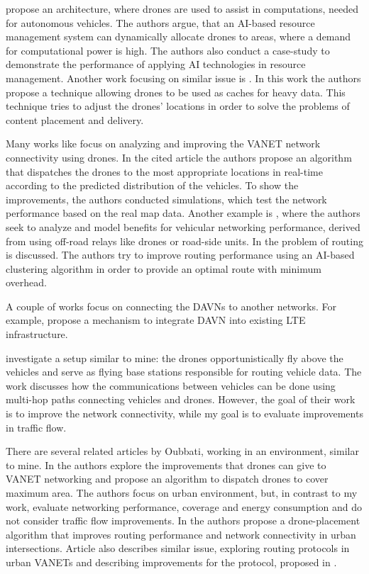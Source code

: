 \documentclass[]{nsm-thesis}
\begin{document}
\textcite{peng2021edge} propose an architecture, where drones are used to assist in computations, needed for autonomous vehicles. The authors argue, that an AI-based resource management system can dynamically allocate drones to areas, where a demand for computational power is high. The authors also conduct a case-study to demonstrate the performance of applying AI technologies in resource management. Another work focusing on similar issue is \textcite{Wu2020Caching}. In this work the authors propose a technique allowing drones to be used as caches for heavy data. This technique tries to adjust the drones' locations in order to solve the problems of content placement and delivery.

Many works like \textcite{lin2020novel} focus on analyzing and improving the \ac{VANET} network connectivity using drones. In the cited article the authors propose an algorithm that dispatches the drones to the most appropriate locations in real-time according to the predicted distribution of the vehicles. To show the improvements, the authors conducted simulations, which test the network performance based on the real map data. Another example is \textcite{khabbaz2019modeling}, where the authors seek to analyze and model benefits for vehicular networking performance, derived from using off-road relays like drones or road-side units. In \textcite{tariq2020imoc} the problem of routing is discussed. The authors try to improve routing performance using an AI-based clustering algorithm in order to provide an optimal route with minimum overhead.

A couple of works focus on connecting the \acp{DAVN} to another networks. For example, \textcite{saputro2018security} propose a mechanism to integrate \ac{DAVN} into existing LTE infrastructure.

\textcite{Khabbaz2021Multihop} investigate a setup similar to mine: the drones opportunistically fly above the vehicles and serve as flying base stations responsible for routing vehicle data. The work discusses how the communications between vehicles can be done using multi-hop paths connecting vehicles and drones. However, the goal of their work is to improve the network connectivity, while my goal is to evaluate improvements in traffic flow.

There are several related articles by Oubbati, working in an environment, similar to mine.
In \cite{Oubbati2021Dispatch} the authors explore the improvements that drones can give to \ac{VANET} networking and propose an algorithm to dispatch drones to cover maximum area. The authors focus on urban environment, but, in contrast to my work, evaluate networking performance, coverage and energy consumption and do not consider traffic flow improvements. In \cite{Oubbati2016intersection} the authors propose a drone-placement algorithm that improves routing performance and network connectivity in urban intersections. Article \cite{OUBBATI201793} also describes similar issue, exploring routing protocols in urban \acp{VANET} and describing improvements for the protocol, proposed in \cite{Oubbati2016intersection}.
\end{document}

